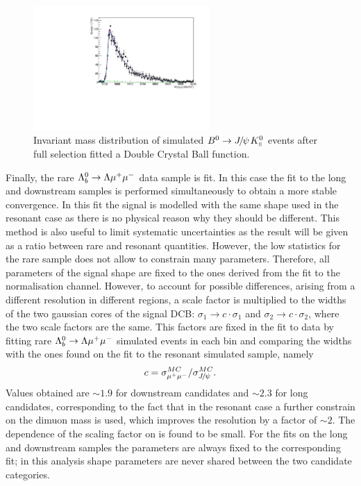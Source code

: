 \begin{figure}
\centering
\includegraphics[width=0.6\textwidth]{Lmumu/figs/MassFits/fitKS_bkg.pdf}
\caption{Invariant mass distribution of simulated $\Bz\ra\jpsi\KS$ events after 
full selection fitted a Double Crystal Ball function. }
\label{fig:KSbkgFit}
\end{figure}

Finally, the rare $\Lambda^0_b\rightarrow\Lambda\mu^+\mu^-$ data sample is fit. In this case the fit to the long
and downstream samples is performed simultaneously to obtain a more stable convergence. 
In this fit the signal is modelled with the same shape used in the resonant case as there is no physical
reason why they should be different. This method is also useful to limit systematic uncertainties
as the result will be given as a ratio between rare and resonant quantities.
However, the low statistics for the rare sample does not allow to constrain many parameters.
Therefore, all parameters of the signal shape are fixed to
the ones derived from the fit to the normalisation channel. However, to account for possible differences, 
arising from a different resolution in different \qsq regions, a scale factor is multiplied
to the widths of the two gaussian cores of the signal DCB: $\sigma_1 \rightarrow c\cdot \sigma_1$
and $\sigma_2 \rightarrow c\cdot \sigma_2$, where the two scale factors are the same. This factors
are fixed in the fit to data by fitting rare $\Lambda^0_b\rightarrow\Lambda\mu^+\mu^-$ simulated events in each \qsq bin and comparing
the widths with the ones found on the fit to the resonant simulated sample, namely
\begin{equation}
c = \sigma_{\mumu}^{MC} / \sigma_{\jpsi}^{MC}.
\end{equation}
Values obtained are $\sim 1.9$ for downstream candidates and $\sim 2.3$ for long candidates,
corresponding to the fact that in the resonant case a further constrain on the dimuon mass
is used, which improves the resolution by a factor of $\sim2$. The dependence of the scaling factor on \qsq 
is found to be small. For the fits on the long and downstream samples the parameters are always fixed to the
corresponding \jpsi fit; in this analysis shape parameters are never shared between the two candidate categories.

